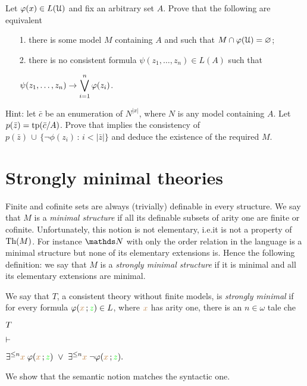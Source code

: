 \begin{exercise}
Let $\varphi(x)\in L(\EuScript U)$ and fix an arbitrary set $A$.
Prove that the following are equivalent
\begin{itemize}
\item[1.] there is some model $M$ containing $A$ and such that $M\cap\varphi(\EuScript U)=\varnothing$;
\item[2.] there is no consistent formula $\psi(z_1,\dots,z_n)\in L(A)$ such that

\hfil$\displaystyle\psi(z_1,\dots,z_n)\rightarrow\bigvee^n_{i=1}\varphi(z_i)$.
\end{itemize}
Hint: let $\bar c$ be an enumeration of $N^{|x|}$, where $N$ is any model containing $A$.
Let $p(\bar z)={\rm tp}(\bar c/A)$.
Prove that  implies the consistency of $p(\bar z)\,\cup\, \big\{\neg\phi(z_i)\, :\, i<|\bar z|\big\}$ and deduce the existence of the required $M$.\QED
\end{exercise}


\section{Strongly minimal theories\label{tfm}}%
 
\def\medrel#1{\parbox[t]{5ex}{$\displaystyle\hfil #1$}}
\def\ceq#1#2#3{\parbox{15ex}{$\displaystyle #1$}\medrel{#2}$\displaystyle  #3$}

Finite and cofinite sets are always (trivially) definable in every structure.
We say that $M$ is a \emph{minimal structure\/} if all its definable subsets of arity one are finite or cofinite.
Unfortunately, this notion is not elementary, i.e.\@ it is not a property of $\textrm{Th}(M)$.
For instance $\NN$ with only the order relation in the language is a minimal structure but 
none of its elementary extensions is.
Hence the following definition: 
we say that $M$ is a \emph{strongly minimal structure\/} if it is minimal and all its elementary extensions are minimal.

We say that $T$, a consistent theory without finite models, is \emph{strongly minimal\/} if 
for every formula $\varphi({\color{brown} x}\,;{\color{green} z})\in L$, where ${\color{brown} x}$ has arity one, there is an  $n\in\omega$ tale che

\ceq{\hfill T}
{\proves}
{\E^{\le n}{\mr x}\;\phi({\mr x}\,;{\gr z})\ \vee\ \E^{\le n}{\mr x}\;\neg\phi({\mr x}\,;{\gr z}).}

We show that the semantic notion matches the syntactic one.

